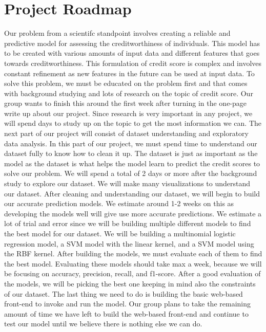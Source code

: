 \documentclass[conference, 11pt]{IEEEtran}
\begin{document}
\section{Project Roadmap}
Our problem from a scientifc standpoint
involves creating a reliable and predictive model for assessing the creditworthiness of individuals. This model has to
be created with various amounts of input data and different features that goes
towards creditworthiness. This formulation of credit score is complex and involves 
constant refinement as new features in the future can be used at input
data.
\vspace{5mm}\newline
To solve this problem, we must be educated on the problem first and that comes
with background studying and lots of research on the topic of credit score. Our
group wants to finish this around the first week after turning in the one-page write
up about our project. Since research is very important in any project, we will
spend days to study up on the topic to get the most information we can.
The next part of our project will consist of dataset understanding and exploratory data analysis. 
In this part of our project, we must spend time to understand our dataset fully to know how
to clean it up. The dataset is just as important as the model as the dataset is
what helps the model learn to predict the
credit scores to solve our problem. We
will spend a total of 2 days or more after the background study to explore our
dataset. We will make many visualizations to understand our dataset.
After cleaning and understanding our
dataset, we will begin to build our accurate prediction models. We estimate
around 1-2 weeks on this as developing
the models well will give use more accurate predictions. We estimate a lot of
trial and error since we will be building multiple different models to find the
best model for our dataset. We will be
building a multinomial logistic regression
model, a SVM model with the linear kernel, and a SVM model using the RBF
kernel.
\vspace{5mm}\newline
After building the models, we must evaluate each of them to find the best model.
Evaluating these models should take max
a week, because we will be focusing on
accuracy, precision, recall, and f1-score.
After a good evaluation of the models,
we will be picking the best one keeping in
mind also the constraints of our dataset.
The last thing we need to do is building
the basic web-based front-end to invoke
and run the model. Our group plans to
take the remaining amount of time we
have left to build the web-based front-end and continue to test our model until
we believe there is nothing else we can
do.
\end{document}
